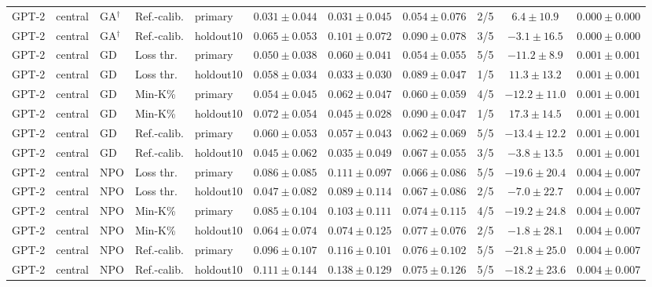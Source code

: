 \begin{table}[t]
\begin{tabular*}{\textwidth}{@{\extracolsep{\fill}}lllllcccccc@{}}
GPT-2 & central & GA$^{\dagger}$ & Ref.-calib. & primary & $0.031 \pm 0.044$ & $0.031 \pm 0.045$ & $0.054 \pm 0.076$ & 2/5 & $6.4 \pm 10.9$ & $0.000 \pm 0.000$ \\
GPT-2 & central & GA$^{\dagger}$ & Ref.-calib. & holdout10 & $0.065 \pm 0.053$ & $0.101 \pm 0.072$ & $0.090 \pm 0.078$ & 3/5 & $-3.1 \pm 16.5$ & $0.000 \pm 0.000$ \\
GPT-2 & central & GD & Loss thr. & primary & $0.050 \pm 0.038$ & $0.060 \pm 0.041$ & $0.054 \pm 0.055$ & 5/5 & $-11.2 \pm 8.9$ & $0.001 \pm 0.001$ \\
GPT-2 & central & GD & Loss thr. & holdout10 & $0.058 \pm 0.034$ & $0.033 \pm 0.030$ & $0.089 \pm 0.047$ & 1/5 & $11.3 \pm 13.2$ & $0.001 \pm 0.001$ \\
GPT-2 & central & GD & Min-K\% & primary & $0.054 \pm 0.045$ & $0.062 \pm 0.047$ & $0.060 \pm 0.059$ & 4/5 & $-12.2 \pm 11.0$ & $0.001 \pm 0.001$ \\
GPT-2 & central & GD & Min-K\% & holdout10 & $0.072 \pm 0.054$ & $0.045 \pm 0.028$ & $0.090 \pm 0.047$ & 1/5 & $17.3 \pm 14.5$ & $0.001 \pm 0.001$ \\
GPT-2 & central & GD & Ref.-calib. & primary & $0.060 \pm 0.053$ & $0.057 \pm 0.043$ & $0.062 \pm 0.069$ & 5/5 & $-13.4 \pm 12.2$ & $0.001 \pm 0.001$ \\
GPT-2 & central & GD & Ref.-calib. & holdout10 & $0.045 \pm 0.062$ & $0.035 \pm 0.049$ & $0.067 \pm 0.055$ & 3/5 & $-3.8 \pm 13.5$ & $0.001 \pm 0.001$ \\
GPT-2 & central & NPO & Loss thr. & primary & $0.086 \pm 0.085$ & $0.111 \pm 0.097$ & $0.066 \pm 0.086$ & 5/5 & $-19.6 \pm 20.4$ & $0.004 \pm 0.007$ \\
GPT-2 & central & NPO & Loss thr. & holdout10 & $0.047 \pm 0.082$ & $0.089 \pm 0.114$ & $0.067 \pm 0.086$ & 2/5 & $-7.0 \pm 22.7$ & $0.004 \pm 0.007$ \\
GPT-2 & central & NPO & Min-K\% & primary & $0.085 \pm 0.104$ & $0.103 \pm 0.111$ & $0.074 \pm 0.115$ & 4/5 & $-19.2 \pm 24.8$ & $0.004 \pm 0.007$ \\
GPT-2 & central & NPO & Min-K\% & holdout10 & $0.064 \pm 0.074$ & $0.074 \pm 0.125$ & $0.077 \pm 0.076$ & 2/5 & $-1.8 \pm 28.1$ & $0.004 \pm 0.007$ \\
GPT-2 & central & NPO & Ref.-calib. & primary & $0.096 \pm 0.107$ & $0.116 \pm 0.101$ & $0.076 \pm 0.102$ & 5/5 & $-21.8 \pm 25.0$ & $0.004 \pm 0.007$ \\
GPT-2 & central & NPO & Ref.-calib. & holdout10 & $0.111 \pm 0.144$ & $0.138 \pm 0.129$ & $0.075 \pm 0.126$ & 5/5 & $-18.2 \pm 23.6$ & $0.004 \pm 0.007$ \\

\end{tabular*}
\end{table}
